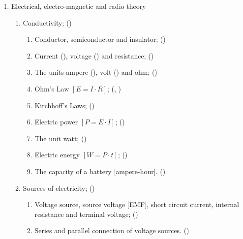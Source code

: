 \renewcommand{\theenumiv}{\arabic{enumiv}}
\renewcommand{\labelenumiv}{\theenumi.\theenumii.\theenumiii.\theenumiv}
\renewcommand{\p@enumiv}{\theenumi.\theenumii.\theenumiii.}
\makeatother

\begin{flushleft}
  
\begin{enumerate}
\item Electrical, electro-magnetic and radio theory
\begin{enumerate}

\item Conductivity; ()\label{HAREC.a.1.1}
\begin{enumerate}
\item Conductor, semiconductor and insulator; ()\label{HAREC.a.1.1.1}
\item Current (), voltage () and resistance; ()\label{HAREC.a.1.1.2}
\item The units ampere (), volt () and ohm; ()\label{HAREC.a.1.1.3}
\item Ohm's Law  \(\left[E = I \cdot R\right]\); (, )\label{HAREC.a.1.1.4}
\item Kirchhoff's Laws; ()\label{HAREC.a.1.1.5}
\item Electric power \(\left[P = E \cdot I\right]\); ()\label{HAREC.a.1.1.6}
\item The unit watt; ()\label{HAREC.a.1.1.7}
\item Electric energy \(\left[W = P \cdot t\right]\); ()\label{HAREC.a.1.1.8}
\item The capacity of a battery [ampere-hour]. ()\label{HAREC.a.1.1.9}
\end{enumerate}

\item Sources of electricity; ()\label{HAREC.a.1.2}
\begin{enumerate}
\item Voltage source, source voltage [EMF], short circuit current, internal resistance and terminal voltage; ()\label{HAREC.a.1.2.1}
\item Series and parallel connection of voltage sources. ()\label{HAREC.a.1.2.2}
\end{enumerate}


\end{enumerate}
\end{enumerate}
\end{flushleft}

